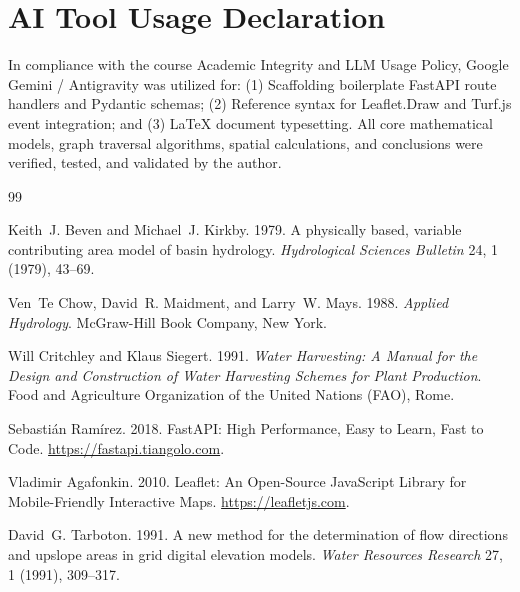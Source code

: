 \documentclass[manuscript,screen,review]{acmart}
\begin{document}
\section{AI Tool Usage Declaration}
\label{sec:ai-usage}
In compliance with the course Academic Integrity and LLM Usage Policy, Google Gemini / Antigravity was utilized for: (1) Scaffolding boilerplate FastAPI route handlers and Pydantic schemas; (2) Reference syntax for Leaflet.Draw and Turf.js event integration; and (3) LaTeX document typesetting. All core mathematical models, graph traversal algorithms, spatial calculations, and conclusions were verified, tested, and validated by the author.

\begin{thebibliography}{99}

Keith~J. Beven and Michael~J. Kirkby. 1979.
\newblock A physically based, variable contributing area model of basin hydrology.
\newblock \emph{Hydrological Sciences Bulletin} 24, 1 (1979), 43--69.

Ven~Te Chow, David~R. Maidment, and Larry~W. Mays. 1988.
\newblock \emph{Applied Hydrology}.
\newblock McGraw-Hill Book Company, New York.

Will Critchley and Klaus Siegert. 1991.
\newblock \emph{Water Harvesting: A Manual for the Design and Construction of Water Harvesting Schemes for Plant Production}.
\newblock Food and Agriculture Organization of the United Nations (FAO), Rome.

Sebasti{\'a}n Ram{\'i}rez. 2018.
\newblock FastAPI: High Performance, Easy to Learn, Fast to Code.
\newblock \url{https://fastapi.tiangolo.com}.

Vladimir Agafonkin. 2010.
\newblock Leaflet: An Open-Source JavaScript Library for Mobile-Friendly Interactive Maps.
\newblock \url{https://leafletjs.com}.

David~G. Tarboton. 1991.
\newblock A new method for the determination of flow directions and upslope areas in grid digital elevation models.
\newblock \emph{Water Resources Research} 27, 1 (1991), 309--317.

\end{thebibliography}
\end{document}
